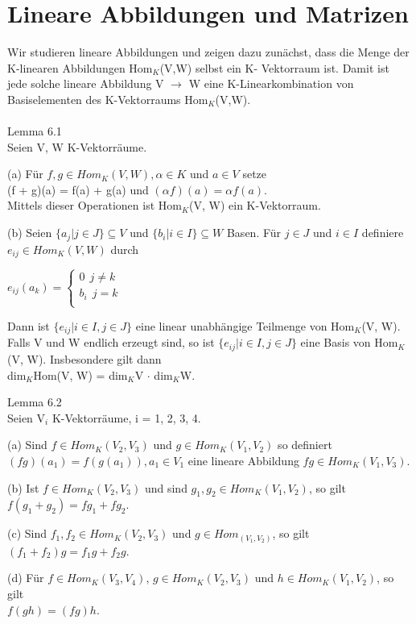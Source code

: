 \documentclass[fontsize=10pt]{scrartcl}
\begin{document}
\section{Lineare Abbildungen und Matrizen}
Wir studieren lineare Abbildungen und zeigen dazu zunächst, dass die Menge der K-linearen Abbildungen Hom$_K$(V,W) selbst ein K- Vektorraum ist. Damit ist jede solche lineare Abbildung V $\to$ W eine K-Linearkombination von Basiselementen des K-Vektorraums Hom$_K$(V,W).\\
\\
Lemma 6.1\\
Seien V, W K-Vektorräume.
\begin{compactenum}
\item[(a)] Für $f, g \in Hom_K(V, W), \alpha \in K$ und $a \in V$ setze\\
(f + g)(a) = f(a) + g(a) und $(\alpha f)(a) = \alpha f(a)$.\\
Mittels dieser Operationen ist Hom$_K$(V, W) ein K-Vektorraum.
\item[(b)] Seien $\{a_j | j \in J\} \subseteq V$ und $\{b_i | i \in I\} \subseteq W$ Basen. Für $j \in J$ und $i \in I$ definiere $e_{ij} \in Hom_K(V, W)$ durch
\begin{center}
$e_{ij}(a_k) =
\begin{cases}
0 ~~j \neq k\\
b_i~~ j = k\\
\end{cases}$
\end{center}
Dann ist $\{e_{ij} | i \in I, j \in J\}$ eine linear unabhängige Teilmenge von Hom$_K$(V, W). Falls V und W endlich erzeugt sind, so ist $\{e_{ij} | i \in I, j \in J\}$ eine Basis von Hom$_K$(V, W). Insbesondere  gilt dann \\dim$_K$Hom(V, W) = dim$_K$V $\cdot$ dim$_K$W.\\
\end{compactenum}
Lemma 6.2\\
Seien V$_i$ K-Vektorräume, i = 1, 2, 3, 4.
\begin{compactenum}
\item [(a)]Sind $f \in Hom_K (V_2, V_3)$ und $g \in Hom_K (V_1, V_2)$ so definiert $(fg)(a_1) = f(g(a_1)), a_1 \in V_1$
eine lineare Abbildung $fg \in Hom_K(V_1,V_3)$.
\item[(b)] Ist $f \in Hom_K (V_2, V_3)$ und sind $g_1, g_2 \in Hom_K (V_1, V_2)$, so gilt\\
$f(g_1 +g_2)=fg_1 +fg_2$.
\item[(c)] Sind $f_1, f_2 \in Hom_K (V_2, V_3)$ und $g \in Hom_ (V_1, V_2)$, so gilt\\
$(f_1 + f_2)g = f_1g + f_2g$.
\item[(d)] Für $f \in Hom_K(V_3,V_4)$, $g \in Hom_K(V_2,V_3)$ und $h \in Hom_K(V_1,V_2)$, so gilt\\
$f(gh) = (fg)h$.\\
\end{compactenum}
\end{document}
